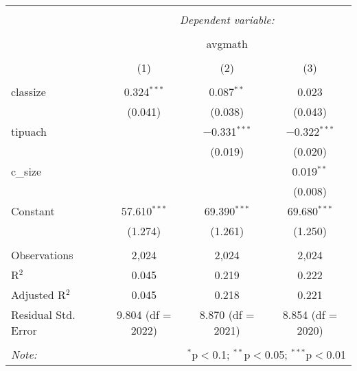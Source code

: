 
\begin{table}[!htbp] \centering 
  \caption{} 
  \label{} 
\begin{tabular}{@{\extracolsep{5pt}}lccc} 
\\[-1.8ex]\hline 
\hline \\[-1.8ex] 
 & \multicolumn{3}{c}{\textit{Dependent variable:}} \\ 
\cline{2-4} 
\\[-1.8ex] & \multicolumn{3}{c}{avgmath} \\ 
\\[-1.8ex] & (1) & (2) & (3)\\ 
\hline \\[-1.8ex] 
 classize & 0.324$^{***}$ & 0.087$^{**}$ & 0.023 \\ 
  & (0.041) & (0.038) & (0.043) \\ 
  tipuach &  & $-$0.331$^{***}$ & $-$0.322$^{***}$ \\ 
  &  & (0.019) & (0.020) \\ 
  c\_size &  &  & 0.019$^{**}$ \\ 
  &  &  & (0.008) \\ 
  Constant & 57.610$^{***}$ & 69.390$^{***}$ & 69.680$^{***}$ \\ 
  & (1.274) & (1.261) & (1.250) \\ 
 \hline \\[-1.8ex] 
Observations & 2,024 & 2,024 & 2,024 \\ 
R$^{2}$ & 0.045 & 0.219 & 0.222 \\ 
Adjusted R$^{2}$ & 0.045 & 0.218 & 0.221 \\ 
Residual Std. Error & 9.804 (df = 2022) & 8.870 (df = 2021) & 8.854 (df = 2020) \\ 
\hline 
\hline \\[-1.8ex] 
\textit{Note:}  & \multicolumn{3}{r}{$^{*}$p$<$0.1; $^{**}$p$<$0.05; $^{***}$p$<$0.01} \\ 
\end{tabular} 
\end{table} 
